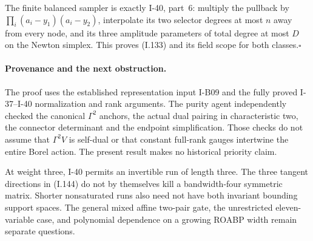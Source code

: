 The finite balanced sampler is exactly I-40, part~6: multiply
the pullback by $\prod_i(a_i-y_1)(a_i-y_2)$, interpolate its two
selector degrees at most $n$ away from every node, and its
three amplitude parameters of total degree at most $D$ on
the Newton simplex. This proves (I.133) and its field scope
for both classes.\hfill$\square$

\paragraph{Provenance and the next obstruction.}
The proof uses the established representation input I-B09 and
the fully proved I-37--I-40 normalization and rank arguments.
The purity agent independently checked the canonical
$\Gamma^2$ anchors, the actual dual pairing in characteristic
two, the connector determinant and the endpoint simplification.
Those checks do not assume that $\Gamma^2V$ is self-dual or
that constant full-rank gauges intertwine the entire Borel
action. The present result makes no historical priority claim.

At weight three, I-40 permits an invertible run of length three.
The three tangent directions in (I.144) do not by themselves
kill a bandwidth-four symmetric matrix. Shorter nonsaturated
runs also need not have both invariant bounding support spaces.
The general mixed affine two-pair gate, the unrestricted
eleven-variable case, and polynomial dependence on a growing
ROABP width remain separate questions.
